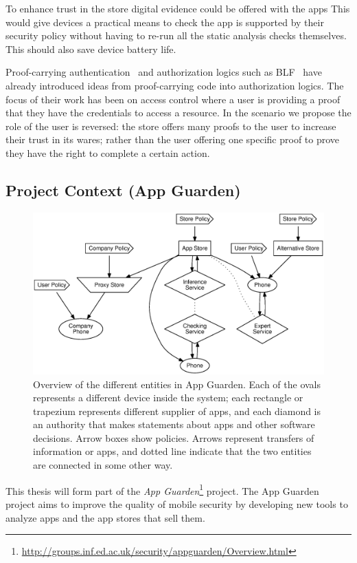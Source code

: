 \documentclass[a4paper]{article}
\begin{document}
To enhance trust in the store digital evidence could be offered
with the apps This would give devices a practical means to check the app is
supported by their security policy without having to re-run all the static
analysis checks
themselves. This should also save device battery life.  

Proof-carrying authentication~\cite{Appel:1999dq} and authorization logics such
as BLF~\cite{Whitehead:2004bu} have already introduced ideas from proof-carrying
code into authorization logics. The focus of their work has been on
access control where a user is providing a proof that they have the credentials
to access a resource.   In the scenario we propose the role of the user is
reversed: the store offers many proofs to the user to increase their trust in
its wares; rather than the user offering one specific proof to prove they have
the right to complete a certain action.


\subsection{Project Context (App Guarden)}

\begin{figure}
  \includegraphics[width=\linewidth]{img/appguarden.eps}
  \caption{Overview of the different entities in App Guarden.  Each of the ovals
  represents a different device inside the system; each rectangle or trapezium
  represents  different supplier of apps, and each diamond is an authority that
  makes statements about apps and other software decisions.  Arrow boxes show
policies.  Arrows represent transfers of information or apps, and dotted line
indicate that the two entities are connected in some other way.}\label{fig:ag}
\end{figure}

This thesis will form part of the \emph{App
Guarden}\footnote{\url{http://groups.inf.ed.ac.uk/security/appguarden/Overview.html}}
project.  The App Guarden project aims to improve the quality of mobile security
by developing new tools to analyze apps and the app stores that sell them.
\end{document}
